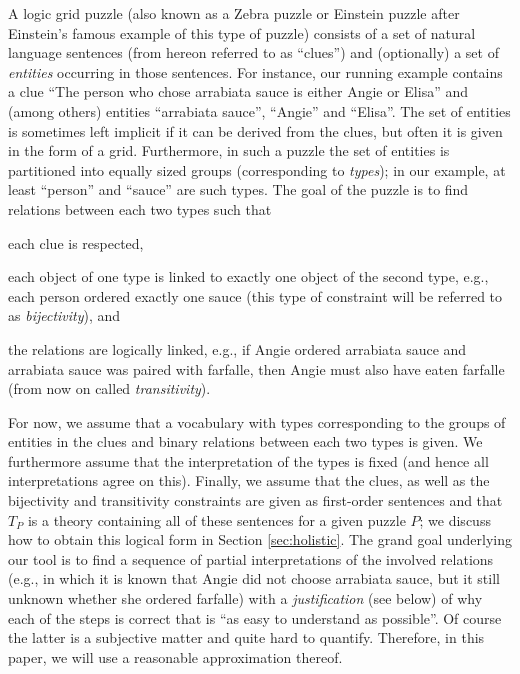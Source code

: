 A logic grid puzzle  (also known as a Zebra puzzle or Einstein puzzle after Einstein's famous example of this type of puzzle) consists of a set of natural language sentences (from hereon referred to as ``clues'') and (optionally) a set of \emph{entities} occurring in those sentences. 
For instance, our running example contains a clue ``The person who chose arrabiata sauce is either Angie or Elisa'' and (among others) entities ``arrabiata sauce'', ``Angie'' and ``Elisa''. 
The set of entities is sometimes left implicit if it can be derived from the clues, but often it is given in the form of a grid. 
Furthermore, in such a puzzle the set of entities is partitioned into equally sized groups (corresponding to \emph{types}); in our example, at least ``person'' and ``sauce'' are such types. 
The goal of the puzzle is to find relations between each two types such that
\begin{compactitem}
	\item each clue is respected, 
	\item each object of one type is linked to exactly one object of the second type, e.g., each person ordered exactly one sauce (this type of constraint will be referred to as \emph{bijectivity}), and 
	\item the relations are logically linked, e.g., if Angie ordered arrabiata sauce and arrabiata sauce was paired with farfalle, then Angie must also have eaten farfalle (from now on called \emph{transitivity}). 
\end{compactitem}

For now, we assume that a vocabulary with types corresponding to the groups of entities in the clues and binary relations between each two types is given.
We furthermore assume that the interpretation of the types is fixed (and hence all interpretations agree on this). 
Finally, we assume that the clues, as well as the bijectivity and transitivity constraints are given as first-order sentences and that $T_P$ is a theory containing all of these sentences for a given puzzle $P$; we discuss how to obtain this logical form in Section \ref{sec:holistic}. 
The grand goal underlying our tool is to find a sequence of partial interpretations of the involved relations (e.g., in which it is known that Angie did not choose arrabiata sauce, but it still unknown whether she ordered farfalle) with a 
\emph{justification} (see below) of why each of the steps is correct that is ``as easy to understand as possible''. 
Of course the latter is a subjective matter and quite hard to quantify. Therefore, in this paper, we will use a reasonable approximation thereof. 


